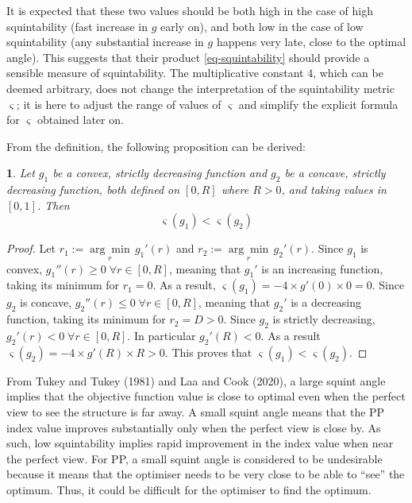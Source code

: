 \documentclass[
  12pt,
]{interact}
\theoremstyle{plain}
\newtheorem{prop}{\protect\propositionname}
\providecommand{\propositionname}{Proposition}
\begin{document}
It is expected that these two values should be both high in the case of
high squintability (fast increase in \(g\) early on), and both low in
the case of low squintability (any substantial increase in \(g\) happens
very late, close to the optimal angle). This suggests that their product
\eqref{eq-squintability} should provide a sensible measure of
squintability. The multiplicative constant \(4\), which can be deemed
arbitrary, does not change the interpretation of the squintability
metric \(\varsigma\); it is here to adjust the range of values of
\(\varsigma\) and simplify the explicit formula for \(\varsigma\)
obtained later on.

From the definition, the following proposition can be derived:

\begin{prop}\label{prop:convex-concave}
Let $g_1$ be a convex, strictly decreasing function and $g_2$ be a concave, strictly decreasing function, both defined on $[0, R]$ where $R>0$, and taking values in $[0, 1]$. Then
$$\varsigma(g_1) < \varsigma(g_2)$$
\end{prop}
\begin{proof}
Let $r_1 := \underset{r}{\arg \min }\,g_1'(r)$ and $r_2 := \underset{r}{\arg \min }\,g_2'(r)$.
Since $g_1$ is convex, $g_1''(r) \geq 0 \; \forall r \in [0, R]$, meaning that $g_1'$ is an increasing function, taking its minimum for $r_1=0$. As a result, $\varsigma(g_1)=-4 \times g'(0) \times 0 =0$.
Since $g_2$ is concave, $g_2''(r) \leq 0 \; \forall r \in [0, R]$, meaning that $g_2'$ is a decreasing function, taking its minimum for $r_2=D>0$. Since $g_2$ is strictly decreasing, $g_2'(r) < 0 \; \forall r \in [0, R]$. In particular $g_2'(R)<0$. As a result $\varsigma(g_2)=-4 \times g'(R) \times R >0$. This proves that $\varsigma(g_1) < \varsigma(g_2)$.
\end{proof}

From Tukey and Tukey (1981) and Laa and Cook (2020), a large squint
angle implies that the objective function value is close to optimal even
when the perfect view to see the structure is far away. A small squint
angle means that the PP index value improves substantially only when the
perfect view is close by. As such, low squintability implies rapid
improvement in the index value when near the perfect view. For PP, a
small squint angle is considered to be undesirable because it means that
the optimiser needs to be very close to be able to ``see'' the optimum.
Thus, it could be difficult for the optimiser to find the optimum.
\end{document}
